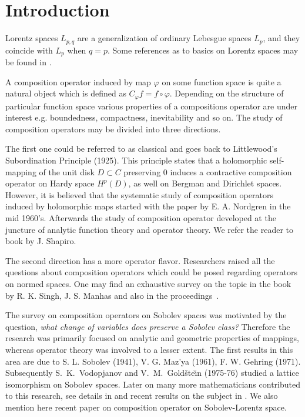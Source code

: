 \documentclass{birkjour}
\theoremstyle{definition}
\theoremstyle{remark}
\numberwithin{equation}{section}
\begin{document}
\section{Introduction}
Lorentz spaces $L_{p,q}$ are a generalization of ordinary Lebesgue spaces $L_p$,
and they coincide with $L_p$ when $q=p$. 
Some references as to basics on Lorentz spaces may be found in \cite{SW, M, G}.

A composition operator induced by map $\varphi$ on some function space is quite a natural object
which is defined as $C_\varphi f = f\circ\varphi$. 
Depending on the structure of particular function space various properties of a compositions operator 
are under interest e.g. boundedness, compactness, inevitability and so on.  
The study of composition operators may be divided into three directions. 

The first one could be referred to as classical and goes back to 
Littlewood’s Subordination Principle (1925).
This principle states that a holomorphic  self-mapping of the unit disk $D\subset C$
preserving $0$ induces a contractive composition operator on Hardy space $H^p(D)$,
as well on Bergman and Dirichlet spaces.	 
However, it is believed that the systematic study of composition operators
induced by holomorphic maps started with the paper \cite{N} by E. A. Nordgren in the mid 1960's. 
Afterwards the study of composition operator developed 
at the juncture of analytic function theory and operator theory.
We refer the reader to book \cite{S} by J. Shapiro.

The second direction has a more operator flavor.    
Researchers raised all the questions about composition operators which could be 
posed regarding operators on normed spaces. 
% 
One may find an exhaustive survey on the topic in the book \cite{SM} by R. K. Singh, J. S. Manhas 
and also in the proceedings~\cite{SonCO}.

The survey on composition operators on Sobolev spaces was motivated by
the question, \textit{what change of variables does preserve a Sobolev class?} 
Therefore the research was primarily focused on analytic and geometric properties
of mappings, whereas operator theory was involved to a lesser extent.   	
The first results in this area are due to S. L. Sobolev (1941), 
V. G. Maz'ya (1961), F. W. Gehring (1971).
Subsequently S.~K.~Vodopjanov and V.~M.~Gold{\v{s}}te{\u\i}n (1975-76)
studied a lattice isomorphism on Sobolev spaces.
Later on many more mathematicians contributed to this research,
see details in \cite{V2005, V2012} and recent results 
on the subject in \cite{VN2015, V2016}. 
We also mention here recent paper \cite{HKM} on composition operator on Sobolev-Lorentz space.
 
\end{document}
